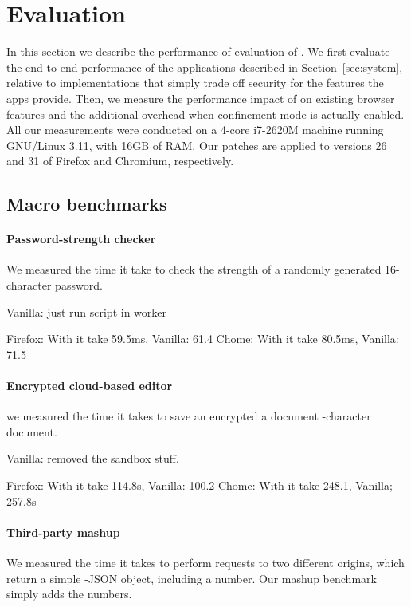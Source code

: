 \section{Evaluation}
\label{sec:eval}

In this section we describe the performance of evaluation of \sys{}.
%
We first evaluate the end-to-end performance of the \sys{}
applications described in Section~\ref{sec:system}, relative to
implementations that simply trade off security for the features the
apps provide.
%
Then, we measure the performance impact of \sys{} on existing browser
features and the additional overhead when confinement-mode is actually
enabled.
%
All our measurements were conducted on a 4-core i7-2620M machine
running GNU/Linux 3.11, with 16GB of RAM.
%
Our patches are applied to versions 26 and 31 of Firefox and Chromium,
respectively.


\subsection{Macro benchmarks}
\label{sec:eval:macro}

\paragraph{Password-strength checker}
%
We measured the time it take to check the strength of a randomly generated
16-character password.
%

Vanilla: just run script in worker

Firefox: With \sys{} it take 59.5ms, Vanilla: 61.4
Chome: With \sys{} it take 80.5ms, Vanilla:  71.5


\paragraph{Encrypted cloud-based editor}
%
we measured the time it takes to save an encrypted a document
-character document.

Vanilla: removed the sandbox stuff.

Firefox: With \sys{} it take 114.8s, Vanilla: 100.2
Chome: With \sys{} it take 248.1, Vanilla; 257.8s

\paragraph{Third-party mashup}

We measured the time it takes to perform requests to two different origins,
which return a simple -JSON object, including a number.
%
Our mashup benchmark simply adds the numbers.


